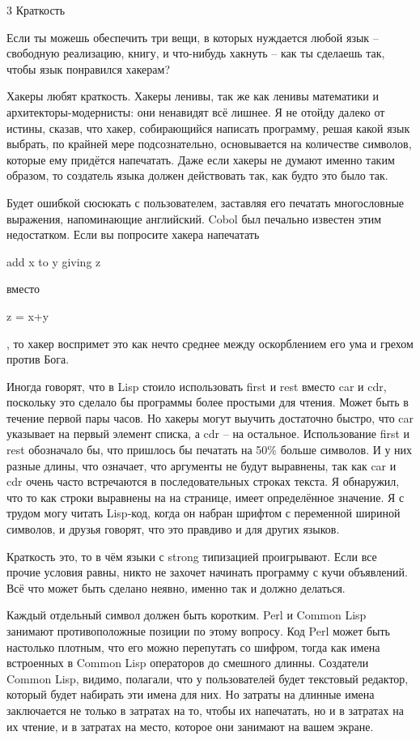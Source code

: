 \documentclass[ebook,12pt,oneside,openany]{memoir}
\begin{document}
3 Краткость

Если ты можешь обеспечить три вещи, в которых нуждается любой язык --
свободную реализацию, книгу, и что-нибудь хакнуть -- как ты сделаешь
так, чтобы язык понравился хакерам?

Хакеры любят краткость. Хакеры ленивы, так же как ленивы математики и
архитекторы-модернисты: они ненавидят всё лишнее. Я не отойду далеко
от истины, сказав, что хакер, собирающийся написать программу, решая
какой язык выбрать, по крайней мере подсознательно, основывается на
количестве символов, которые ему придётся напечатать. Даже если хакеры
не думают именно таким образом, то создатель языка должен действовать
так, как будто это было так.

Будет ошибкой сюсюкать с пользователем, заставляя его печатать
многословные выражения, напоминающие английский. Cobol был печально
известен этим недостатком. Если вы попросите хакера напечатать

add x to y giving z

вместо

z = x+y

, то хакер воспримет это как нечто среднее между оскорблением его ума
и грехом против Бога.

Иногда говорят, что в Lisp стоило использовать first и rest вместо car
и cdr, поскольку это сделало бы программы более простыми для чтения.
Может быть в течение первой пары часов. Но хакеры могут выучить
достаточно быстро, что car указывает на первый элемент списка, а cdr
-- на остальное. Использование first и rest обозначало бы, что
пришлось бы печатать на 50\% больше символов. И у них разные длины,
что означает, что аргументы не будут выравнены, так как car и cdr
очень часто встречаются в последовательных строках текста. Я
обнаружил, что то как строки выравнены на на странице, имеет
определённое значение. Я с трудом могу читать Lisp-код, когда он
набран шрифтом с переменной шириной символов, и друзья говорят, что
это правдиво и для других языков.

Краткость это, то в чём языки с strong типизацией проигрывают. Если
все прочие условия равны, никто не захочет начинать программу с кучи
объявлений. Всё что может быть сделано неявно, именно так и должно
делаться.

Каждый отдельный символ должен быть коротким. Perl и Common Lisp
занимают противоположные позиции по этому вопросу. Код Perl может быть
настолько плотным, что его можно перепутать со шифром, тогда как имена
встроенных в Common Lisp операторов до смешного длинны. Создатели
Common Lisp, видимо, полагали, что у пользователей будет текстовый
редактор, который будет набирать эти имена для них. Но затраты на
длинные имена заключается не только в затратах на то, чтобы их
напечатать, но и в затратах на их чтение, и в затратах на место,
которое они занимают на вашем экране.
\end{document}
